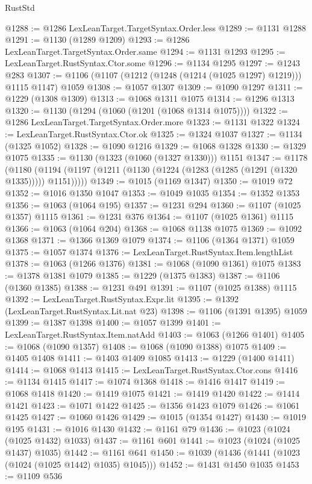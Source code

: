 \begin{lexlean}{RustStd}
\begin{coremodule}
@1288 := @1286 LexLeanTarget.TargetSyntax.Order.less
@1289 := @1131 @1288
@1291 := @1130 (@1289 @1209)
@1293 := @1286 LexLeanTarget.TargetSyntax.Order.same
@1294 := @1131 @1293
@1295 := LexLeanTarget.RustSyntax.Ctor.some
@1296 := @1134 @1295
@1297 := @1243 @283
@1307 := @1106 (@1107 (@1212 (@1248 (@1214 (@1025 @1297) @1219))) @1115 @1147) @1059
@1308 := @1057 @1307
@1309 := @1090 @1297
@1311 := @1229 (@1308 @1309)
@1313 := @1068 @1311 @1075
@1314 := @1296 @1313
@1320 := @1130 (@1294 (@1060 (@1201 (@1068 @1314 @1075))))
@1322 := @1286 LexLeanTarget.TargetSyntax.Order.more
@1323 := @1131 @1322
@1324 := LexLeanTarget.RustSyntax.Ctor.ok
@1325 := @1324 @1037
@1327 := @1134 (@1325 @1052)
@1328 := @1090 @1216
@1329 := @1068 @1328
@1330 := @1329 @1075
@1335 := @1130 (@1323 (@1060 (@1327 @1330))) @1151
@1347 := @1178
    (@1180 (@1194 (@1197 (@1211 (@1130 (@1224 (@1283 (@1285 (@1291 (@1320 @1335))))) @1151)))))
@1349 := @1015 (@1169 @1347)
@1350 := @1019 @72
@1352 := @1016 @1350 @1047
@1353 := @1049 @1035
@1354 := @1352 @1353
@1356 := @1063 (@1064 @195)
@1357 := @1231 @294
@1360 := @1107 (@1025 @1357) @1115
@1361 := @1231 @376
@1364 := @1107 (@1025 @1361) @1115
@1366 := @1063 (@1064 @204)
@1368 := @1068 @1138 @1075
@1369 := @1092 @1368
@1371 := @1366 @1369 @1079
@1374 := @1106 (@1364 @1371) @1059
@1375 := @1057 @1374
@1376 := LexLeanTarget.RustSyntax.Item.lengthList
@1378 := @1063 (@1266 @1376)
@1381 := @1068 (@1090 @1361) @1075
@1383 := @1378 @1381 @1079
@1385 := @1229 (@1375 @1383)
@1387 := @1106 (@1360 @1385)
@1388 := @1231 @491
@1391 := @1107 (@1025 @1388) @1115
@1392 := LexLeanTarget.RustSyntax.Expr.lit
@1395 := @1392 (LexLeanTarget.RustSyntax.Lit.nat @23)
@1398 := @1106 (@1391 @1395) @1059
@1399 := @1387 @1398
@1400 := @1057 @1399
@1401 := LexLeanTarget.RustSyntax.Item.natAdd
@1403 := @1063 (@1266 @1401)
@1405 := @1068 (@1090 @1357)
@1408 := @1068 (@1090 @1388) @1075
@1409 := @1405 @1408
@1411 := @1403 @1409 @1085
@1413 := @1229 (@1400 @1411)
@1414 := @1068 @1413
@1415 := LexLeanTarget.RustSyntax.Ctor.cons
@1416 := @1134 @1415
@1417 := @1074 @1368
@1418 := @1416 @1417
@1419 := @1068 @1418
@1420 := @1419 @1075
@1421 := @1419 @1420
@1422 := @1414 @1421
@1423 := @1071 @1422
@1425 := @1356 @1423 @1079
@1426 := @1061 @1425
@1427 := @1060 @1426
@1429 := @1015 (@1354 @1427)
@1430 := @1019 @195
@1431 := @1016 @1430
@1432 := @1161 @79
@1436 := @1023 (@1024 (@1025 @1432) @1033)
@1437 := @1161 @601
@1441 := @1023 (@1024 (@1025 @1437) @1035)
@1442 := @1161 @641
@1450 := @1039 (@1436 (@1441 (@1023 (@1024 (@1025 @1442) @1035) @1045)))
@1452 := @1431 @1450 @1035
@1453 := @1109 @536

\end{coremodule}
\end{lexlean}
